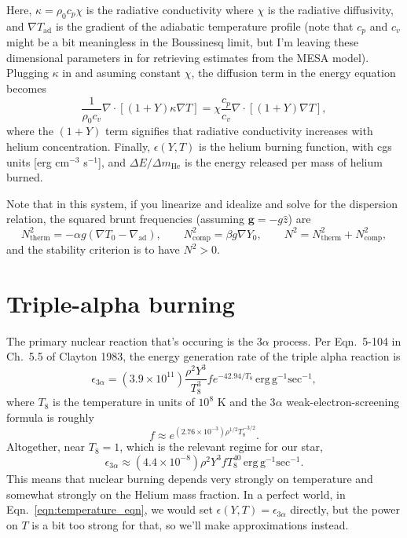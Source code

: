 \documentclass[onecolumn, amsmath, amsfonts, amssymb]{aastex62}
\newcommand{\grad}{\ensuremath{\nabla}}
\renewcommand{\vec}[1]{\ensuremath{\mathbf{#1}}}
\renewcommand{\dot}{\ensuremath{\cdot}}
\begin{document}
Here, $\kappa = \rho_0 c_p \chi$ is the radiative conductivity where $\chi$ is the radiative diffusivity, and $\grad T_{\mathrm{ad}}$ is the gradient of the adiabatic temperature profile (note that $c_p$ and $c_v$ might be a bit meaningless in the Boussinesq limit, but I'm leaving these dimensional parameters in for retrieving estimates from the MESA model).
Plugging $\kappa$ in and asuming constant $\chi$, the diffusion term in the energy equation becomes 
\begin{equation}
\frac{1}{\rho_0 c_v}\grad\dot[(1 + Y)\kappa\grad T] = \chi\frac{c_p}{c_v} \grad\dot[(1 + Y)\grad T],
\end{equation}
where the $(1 + Y)$ term signifies that radiative conductivity increases with helium concentration.
Finally, $\epsilon(Y, T)$ is the helium burning function, with cgs units [erg cm$^{-3}$ s$^{-1}$], and $\Delta E / \Delta m_{\mathrm{He}}$ is the energy released per mass of helium burned.

Note that in this system, if you linearize and idealize and solve for the dispersion relation, the squared brunt frequencies (assuming $\vec{g} = - g \hat{z}$) are
\begin{equation}
N_{\mathrm{therm}}^2 = -\alpha g (\grad T_0 - \grad_{\mathrm{ad}}), \qquad
N_{\mathrm{comp}}^2 =  \beta  g \grad Y_0, \qquad
N^2 = N_{\mathrm{therm}}^2 + N_{\mathrm{comp}}^2,
\end{equation}
and the stability criterion is to have $N^2 > 0$.

\section{Triple-alpha burning}
The primary nuclear reaction that's occuring is the $3\alpha$ process. 
Per Eqn.~5-104 in Ch.~5.5 of Clayton 1983, the energy generation rate of the triple alpha reaction is
\begin{equation}
\epsilon_{3\alpha} = (3.9 \times 10^{11})\frac{\rho^2 Y^3}{T_8^3} f e^{-42.94/T_8}\,\mathrm{erg}\,\mathrm{g}^{-1}\mathrm{sec}^{-1},
\end{equation}
where $T_8$ is the temperature in units of $10^8$ K and the 3$\alpha$ weak-electron-screening formula is roughly
\begin{equation}
f \approx e^{(2.76 \times 10^{-3})\rho^{1/2}T_8^{-3/2}}.
\end{equation}
Altogether, near $T_8 = 1$, which is the relevant regime for our star,
\begin{equation}
\epsilon_{3\alpha} \approx (4.4 \times 10^{-8}) \rho^2 Y^3 f T_8^{40}\,\mathrm{erg}\,\mathrm{g}^{-1}\mathrm{sec}^{-1}.
\end{equation}
This means that nuclear burning depends very strongly on temperature and somewhat strongly on the Helium mass fraction.
In a perfect world, in Eqn.~\ref{eqn:temperature_eqn}, we would set $\epsilon(Y,T) = \epsilon_{3\alpha}$ directly, but the power on $T$ is a bit too strong for that, so we'll make approximations instead.
\end{document}
